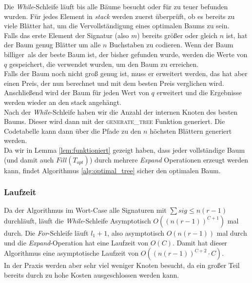 \documentclass[a4paper,10pt,ngerman]{scrartcl}
\begin{document}
    Die \textit{While}-Schleife läuft bis alle Bäume besucht oder für zu teuer befunden wurden.
    Für jedes Element in \textit{stack} werden zuerst überprüft, ob es bereits zu viele Blätter hat, um die Vervollständigung eines optimalen Baums zu sein.\\
    Falls das erste Element der Signatur (also $m$) bereits größer oder gleich $n$ ist, hat der Baum genug Blätter um alle $n$ Buchstaben zu codieren.
    Wenn der Baum \glqq billiger\grqq~als der beste Baum ist, der bisher gefunden wurde, werden die Werte von $q$ gespeichert, die verwendet wurden, um den Baum zu erreichen. \\
    Falls der Baum noch nicht groß genug ist, muss er erweitert werden, das hat aber einen Preis, der nun berechnet und mit dem besten Preis verglichen wird. \\
    Anschließend wird der Baum für jeden Wert von $q$ erweitert und die Ergebnisse werden wieder an den stack angehängt. \\
    Nach der \textit{While}-Schleife haben wir die Anzahl der internen Knoten des besten Baums.
    Dieser wird dann mit der \textsc{generate\_tree} Funktion generiert.
    Die Codetabelle kann dann über die Pfade zu den $n$ höchsten Blättern generiert werden. \\
    Da wir in Lemma \ref{lem:funktioniert} gezeigt haben, dass jeder vollständige Baum (und damit auch $Fill(T_{opt})$) durch mehrere \textit{Expand} Operationen erzeugt werden kann, findet Algorithmus \ref{alg:optimal_tree} sicher den optimalen Baum.

    \subsubsection{Laufzeit}
    Da der Algorithmus im Wort-Case alle Signaturen mit $\sum sig \le n (r - 1)$ durchläuft, läuft die \textit{While}-Schleife Asymptotisch $O((n (r - 1))^{C+1})$ mal durch.
    Die \textit{For}-Schleife läuft $l_1 + 1$, also asymptotisch $O(n(r-1))$ mal durch und die \textit{Expand}-Operation hat eine Laufzeit von $O(C)$.
    Damit hat dieser Algorithmus eine asymptotische Laufzeit von $O((n(r-1))^{C+2} \cdot C)$. \\
    In der Praxis werden aber sehr viel weniger Knoten besucht, da ein großer Teil bereits durch zu hohe Kosten ausgeschlossen werden kann.
\end{document}
